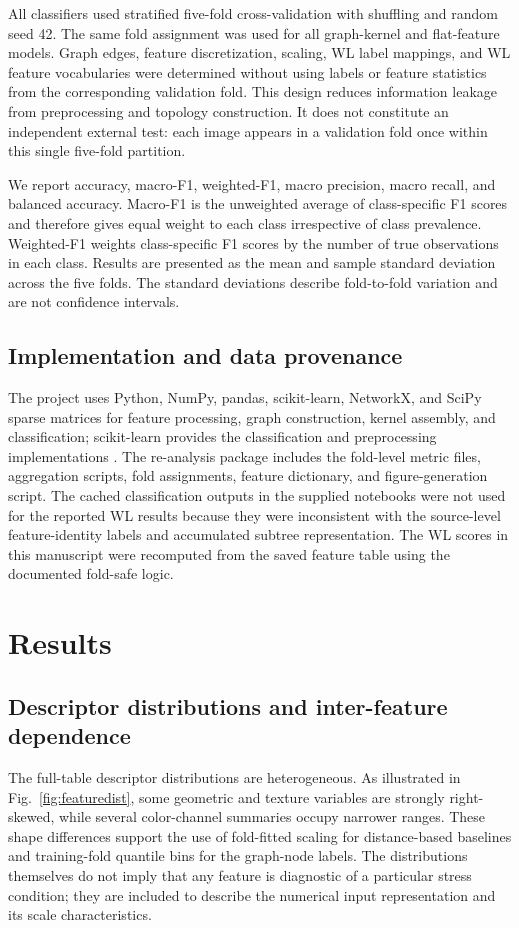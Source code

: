 \documentclass[conference]{IEEEtran}
\begin{document}
All classifiers used stratified five-fold cross-validation with shuffling and random seed 42. The same fold assignment was used for all graph-kernel and flat-feature models. Graph edges, feature discretization, scaling, WL label mappings, and WL feature vocabularies were determined without using labels or feature statistics from the corresponding validation fold. This design reduces information leakage from preprocessing and topology construction. It does not constitute an independent external test: each image appears in a validation fold once within this single five-fold partition.

We report accuracy, macro-F1, weighted-F1, macro precision, macro recall, and balanced accuracy. Macro-F1 is the unweighted average of class-specific F1 scores and therefore gives equal weight to each class irrespective of class prevalence. Weighted-F1 weights class-specific F1 scores by the number of true observations in each class. Results are presented as the mean and sample standard deviation across the five folds. The standard deviations describe fold-to-fold variation and are not confidence intervals.

\subsection{Implementation and data provenance}

The project uses Python, NumPy, pandas, scikit-learn, NetworkX, and SciPy sparse matrices for feature processing, graph construction, kernel assembly, and classification; scikit-learn provides the classification and preprocessing implementations \cite{Pedregosa2011}. The re-analysis package includes the fold-level metric files, aggregation scripts, fold assignments, feature dictionary, and figure-generation script. The cached classification outputs in the supplied notebooks were not used for the reported WL results because they were inconsistent with the source-level feature-identity labels and accumulated subtree representation. The WL scores in this manuscript were recomputed from the saved feature table using the documented fold-safe logic.



\section{Results}

\subsection{Descriptor distributions and inter-feature dependence}
The full-table descriptor distributions are heterogeneous. As illustrated in Fig.~\ref{fig:featuredist}, some geometric and texture variables are strongly right-skewed, while several color-channel summaries occupy narrower ranges. These shape differences support the use of fold-fitted scaling for distance-based baselines and training-fold quantile bins for the graph-node labels. The distributions themselves do not imply that any feature is diagnostic of a particular stress condition; they are included to describe the numerical input representation and its scale characteristics.
\end{document}
